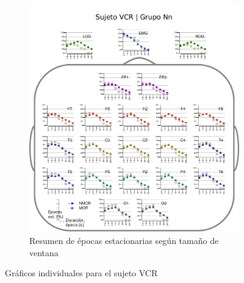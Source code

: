 \begin{figure}
\ContinuedFloat
\begin{subfigure}{\linewidth}
\centering
\includegraphics[width=.9\linewidth]{./img_resultados/cabeza_VCR.pdf}
\caption{Resumen de épocas estacionarias según tamaño de ventana}
\end{subfigure}
\caption{Gráficos individuales para el sujeto VCR}
\end{figure}


